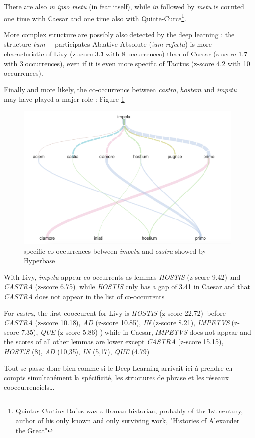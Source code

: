 There are also \textit{in ipso metu} (in fear itself), while \textit{in} followed by \textit{metu} is counted one time with Caesar and one time also with Quinte-Curce\footnote{Quintus Curtius Rufus was a Roman historian, probably of the 1st century, author of his only known and only surviving work, "Histories of Alexander the Great"}.

More complex structure are possibly also detected by the deep learning : the structure \textit{tum} + participates Ablative Absolute (\textit{tum refecta}) is more characteristic of Livy (z-score 3.3 with 8 occurrences) than of Caesar (z-score 1.7 with 3 occurrences), even if it is even more specific of Tacitus (z-score 4.2 with 10 occurrences).

Finally and more likely, the co-occurrence between \textit{castra}, \textit{hostem} and \textit{impetu} may have played a major role : Figure \ref{latin}

\begin{figure}[h]
\begin{center}
\includegraphics[width=16cm]{img/cooc_latin.png}
\caption{specific co-occurrences between \textit{impetu} and \textit{castra} showed by Hyperbase}
\label{latin}
\end{center}
\end{figure}

With Livy, \textit{impetu} appear co-occurrents as lemmas \textit{HOSTIS} (z-score 9.42) and \textit{CASTRA} (z-score 6.75), while \textit{HOSTIS} only has a gap of 3.41 in Caesar and that \textit{CASTRA} does not appear in the list of co-occurrents

For \textit{castra}, the first cooccurent for Livy is \textit{HOSTIS} (z-score 22.72), before \textit{CASTRA} (z-score 10.18), \textit{AD} (z-score 10.85), \textit{IN} (z-score 8.21), \textit{IMPETVS} (z-score 7.35), \textit{QUE} (z-score 5.86) ) while in Caesar, \textit{IMPETVS} does not appear and the scores of all other lemmas are lower except \textit{CASTRA} (z-score 15.15), \textit{HOSTIS} (8),  \textit{AD} (10,35), \textit{IN} (5,17), \textit{QUE} (4.79)

Tout se passe donc bien comme si le Deep Learning arrivait ici à prendre en compte simultanément la spécificité, les structures de phrase et les réseaux cooccurrenciels...

